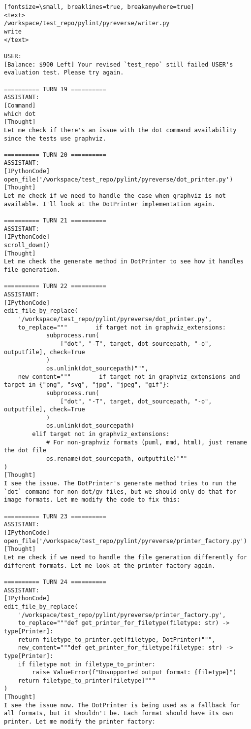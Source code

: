 \begin{verbatim}[fontsize=\small, breaklines=true, breakanywhere=true]
<text>
/workspace/test_repo/pylint/pyreverse/writer.py
write
</text>

USER:
[Balance: $900 Left] Your revised `test_repo` still failed USER's evaluation test. Please try again.

========== TURN 19 ==========
ASSISTANT:
[Command]
which dot
[Thought]
Let me check if there's an issue with the dot command availability since the tests use graphviz.

========== TURN 20 ==========
ASSISTANT:
[IPythonCode]
open_file('/workspace/test_repo/pylint/pyreverse/dot_printer.py')
[Thought]
Let me check if we need to handle the case when graphviz is not available. I'll look at the DotPrinter implementation again.

========== TURN 21 ==========
ASSISTANT:
[IPythonCode]
scroll_down()
[Thought]
Let me check the generate method in DotPrinter to see how it handles file generation.

========== TURN 22 ==========
ASSISTANT:
[IPythonCode]
edit_file_by_replace(
    '/workspace/test_repo/pylint/pyreverse/dot_printer.py',
    to_replace="""        if target not in graphviz_extensions:
            subprocess.run(
                ["dot", "-T", target, dot_sourcepath, "-o", outputfile], check=True
            )
            os.unlink(dot_sourcepath)""",
    new_content="""        if target not in graphviz_extensions and target in {"png", "svg", "jpg", "jpeg", "gif"}:
            subprocess.run(
                ["dot", "-T", target, dot_sourcepath, "-o", outputfile], check=True
            )
            os.unlink(dot_sourcepath)
        elif target not in graphviz_extensions:
            # For non-graphviz formats (puml, mmd, html), just rename the dot file
            os.rename(dot_sourcepath, outputfile)"""
)
[Thought]
I see the issue. The DotPrinter's generate method tries to run the `dot` command for non-dot/gv files, but we should only do that for image formats. Let me modify the code to fix this:

========== TURN 23 ==========
ASSISTANT:
[IPythonCode]
open_file('/workspace/test_repo/pylint/pyreverse/printer_factory.py')
[Thought]
Let me check if we need to handle the file generation differently for different formats. Let me look at the printer factory again.

========== TURN 24 ==========
ASSISTANT:
[IPythonCode]
edit_file_by_replace(
    '/workspace/test_repo/pylint/pyreverse/printer_factory.py',
    to_replace="""def get_printer_for_filetype(filetype: str) -> type[Printer]:
    return filetype_to_printer.get(filetype, DotPrinter)""",
    new_content="""def get_printer_for_filetype(filetype: str) -> type[Printer]:
    if filetype not in filetype_to_printer:
        raise ValueError(f"Unsupported output format: {filetype}")
    return filetype_to_printer[filetype]"""
)
[Thought]
I see the issue now. The DotPrinter is being used as a fallback for all formats, but it shouldn't be. Each format should have its own printer. Let me modify the printer factory:


\end{verbatim}
